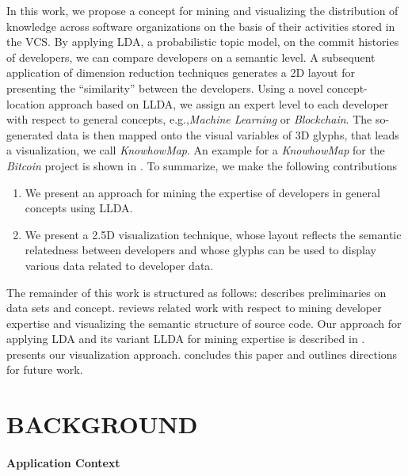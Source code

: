 \documentclass[a4paper,twoside]{article}
\def\eg{e.g.,\xspace}
\begin{document}
In this work, we propose a concept for mining and visualizing the distribution of knowledge across software organizations on the basis of their activities stored in the \ac{VCS}.
By applying \ac{LDA}, a probabilistic topic model, on the commit histories of developers, we can compare developers on a semantic level.
A subsequent application of dimension reduction techniques generates a 2D layout for presenting the \enquote{similarity} between the developers.
Using a novel concept-location approach based on \ac{LLDA}, we assign an expert level to each developer with respect to  general concepts, \eg \textit{Machine Learning} or \textit{Blockchain}.
The so-generated data is then mapped onto the visual variables of 3D glyphs, that leads a visualization, we call \textit{KnowhowMap}.
An example for a \textit{KnowhowMap} for the \textit{Bitcoin} project is shown in .
To summarize, we make the following contributions
\begin{enumerate}
\item We present an approach for mining the expertise of developers in general concepts using \ac{LLDA}.
\item We present a 2.5D visualization technique, whose layout reflects the semantic relatedness between developers and whose glyphs can be used to display various data related to developer data.
\end{enumerate}

\noindent The remainder of this work is structured as follows:
 describes preliminaries on data sets and concept.
 reviews related work with respect to mining developer expertise and visualizing the semantic structure of source code.
Our approach for applying \ac{LDA} and its variant \ac{LLDA} for mining expertise is described in .
 presents our visualization approach.
 concludes this paper and outlines directions for future work.

\section{\uppercase{Background}}
\label{KM:Sec:Background}

\paragraph{Application Context}
\label{KM:SubSec:ApplicationContext}
\end{document}
